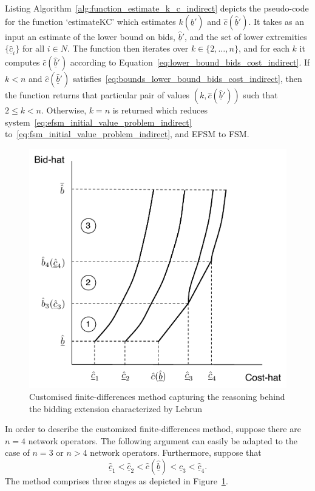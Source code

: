 Listing Algorithm~\ref{alg:function_estimate_k_c_indirect} depicts the pseudo-code for the function `estimateKC' which estimates $k(\underline{\hat{b}}')$ and $\hat{c}(\underline{\hat{b}}')$. It takes as an input an estimate of the lower bound on bids, $\underline{\hat{b}}'$, and the set of lower extremities $\{\underline{\hat{c}}_i\}$ for all $i\in N$. The function then iterates over $k\in\{2,\ldots,n\}$, and for each $k$ it computes $\hat{c}(\underline{\hat{b}}')$ according to Equation~\eqref{eq:lower_bound_bids_cost_indirect}. If $k<n$ and $\hat{c}(\underline{\hat{b}}')$ satisfies~\eqref{eq:bounds_lower_bound_bids_cost_indirect}, then the function returns that particular pair of values $(k, \hat{c}(\underline{\hat{b}}'))$ such that $2\leq k < n$. Otherwise, $k=n$ is returned which reduces system~\eqref{eq:efsm_initial_value_problem_indirect} to~\eqref{eq:fsm_initial_value_problem_indirect}, and EFSM to FSM.

\begin{figure}[t]
  \includegraphics[width=\figsize]{Indirect/Figures/lebrun_solution}
  \caption{Customised finite-differences method capturing the reasoning behind the bidding extension characterized by Lebrun~\cite{Lebrun2006}}
  \label{fig:lebrun_solution_indirect}
\end{figure}

In order to describe the customized finite-differences method, suppose there are $n=4$ network operators. The following argument can easily be adapted to the case of $n=3$ or $n>4$ network operators. Furthermore, suppose that
\begin{equation*}
  \underline{\hat{c}}_1 < \underline{\hat{c}}_2 < \hat{c}(\underline{\hat{b}}) < \underline{\hat{c}}_3 < \underline{\hat{c}}_4.
\end{equation*}
The method comprises three stages as depicted in Figure~\ref{fig:lebrun_solution_indirect}.

